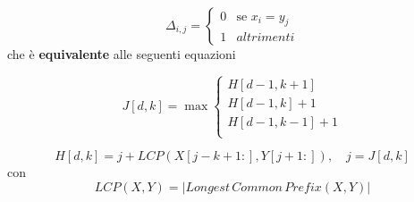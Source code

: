    $$\Delta_{i,j} = \begin{cases}
        0 & \text{se }x_i = y_j \\
        1 & altrimenti
    \end{cases}$$
    che è \textbf{equivalente} alle seguenti equazioni
    
    \begin{equation}
        J[d,k] = \max \begin{cases}
            H[d-1, k + 1] \\
            H[d-1, k] + 1 \\
            H[d-1, k - 1] + 1 \\
        \end{cases}    
        \label{equation:expansion_demonstration}
    \end{equation}
        
    \begin{equation}
        H[d, k] = j + LCP(X[j - k + 1:], Y[j + 1:]), \quad j = J[d, k]
        \label{equation:extension_demonstration}
    \end{equation}
    con
    $$LCP(X, Y) = \lvert Longest \, Common \, Prefix (X, Y) \rvert$$

